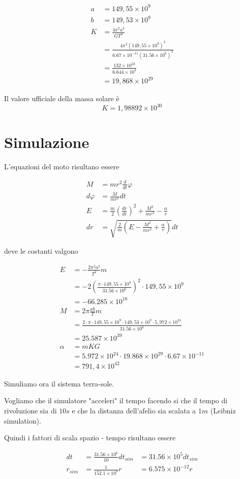 \documentclass[a4paper,11pt]{article}
\begin{document}
\begin{align*}
	a & = 149,55 \times 10^9 \\
	b & = 149,53 \times 10^9 \\
	K & = \frac{4 \pi^2 a^3}{GT^2}\\
	& = \frac{4 \pi^2 (149,55 \times 10^9)^3}{6.67 \times 10^{-11} (31.56 \times 10^6)^2}\\
	& = \frac{132 \times 10^{33}}{6.644 \times 10^4}\\
	& = 19,868 \times 10^{29}
\end{align*}

Il valore ufficiale della massa solare è
\[
	K = 1,98892 \times 10^{30}
\]

\section{Simulazione}

L'equazioni del moto risultano essere

\begin{align*}
    M & = m r^2 \frac{d}{dt} \varphi \\
    d \varphi & = \frac{M}{m r^2} dt \\
	E & = \frac{m}{2} \left( \frac{dr}{dt} \right) ^2 + \frac{M^2}{m r^2} - \frac{\alpha}{r}\\
	dr & = \sqrt{\frac{2}{m} \left( E - \frac{M^2}{m r^2} + \frac{\alpha}{r} \right) } dt
\end{align*}

deve le costanti valgono

\begin{align*}
	E & = - \frac{2 \pi^2 a^2}{T^2} m \\
	& = -2 \left( \frac{\pi \cdot 149,55 \times 10^9}{31.56 \times 10^6} \right)^2 \cdot 149,55 \times 10^9\\
	& = -66.285 \times 10^{18} \\
	M & = 2 \pi \frac{ab}{T} m \\
	& = \frac{2 \cdot \pi \cdot 149,55 \times 10^9 \cdot 149,53 \times 10^9 \cdot 5,972 \times 10^{24}}{31.56 \times 10^6} \\
	& = 25.587 \times 10^{39} \\
	\alpha & = mKG \\
	& = 5.972 \times 10^{24} \cdot 19.868 \times 10^{29} \cdot 6.67 \times 10^{-11} \\
	& = 791,4 \times 10^{42}
\end{align*}


Simuliamo ora il sistema terra-sole.

Vogliamo che il simulatore "acceleri" il tempo facendo si che il tempo di rivoluzione sia di $ 10 s $
e che la distanza dell'afelio sia scalata a $1 m$ (Leibniz simulation).

Quindi i fattori di scala spazio - tempo risultano essere

\begin{align*}
	dt & = \frac{31.56 \times 10^6}{10} dt_{sim} & = 31.56 \times 10^5 dt_{sim} \\
	r_{sim} & = \frac{1}{152.1 \times 10^9} r & = 6.575 \times 10^{-12} r
\end{align*}
\end{document}

